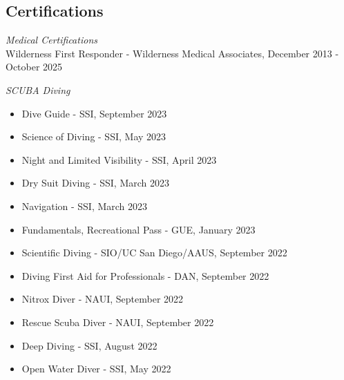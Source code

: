 \documentclass[line,margin]{res}
\begin{document}
\begin{resume}



\section{Certifications}

	{\sl Medical Certifications}\\
	Wilderness First Responder - Wilderness Medical Associates, December 2013 - October 2025

	{\sl SCUBA Diving}\\
	\begin{itemize}
		\item Dive Guide - SSI, September 2023
		\item Science of Diving - SSI, May 2023
		\item Night and Limited Visibility - SSI, April 2023
		\item Dry Suit Diving - SSI, March 2023
		\item Navigation - SSI, March 2023
		\item Fundamentals, Recreational Pass - GUE, January 2023
		\item Scientific Diving - SIO/UC San Diego/AAUS, September 2022
		\item Diving First Aid for Professionals - DAN, September 2022
		\item Nitrox Diver - NAUI, September 2022
		\item Rescue Scuba Diver - NAUI, September 2022
		\item Deep Diving - SSI, August 2022
		\item Open Water Diver - SSI, May 2022
	\end{itemize}


\end{resume}
\end{document}
